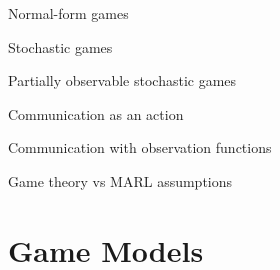 

\leoslide

\subtitle{Games: Models of Multi-Agent Interaction}


\maketitle

\introslide

\begin{frame}{\outline}
    \vspace{10pt}
    \vspace{5pt}
    \blist
        \item Normal-form games
        \item Stochastic games
        \item Partially observable stochastic games  
    \elist
    \vspace{5pt}
    \blist
        \item Communication as an action
        \item Communication with observation functions
    \elist

    \blist
        \item Game theory vs MARL assumptions
    \elist
\end{frame}

\section{Game Models}

